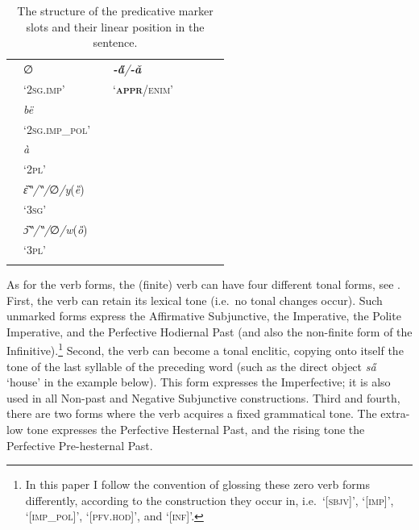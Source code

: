 \documentclass[output=paper,colorlinks,citecolor=brown
]{langscibook}
\begin{document}
\begin{table}
\begin{tabular}{l lllll l l}
 \addlinespace
 & {∅} & {} & {\textit{\textbf{-a̋}/\textbf{-ǎ}}} & {} &  &  &  \\
 & {`\textsc{2sg.imp}'} & {} & {`\textsc{\textbf{appr}/enim}'} & {} &  &  &  \\
 \addlinespace
 & {\textit{bë}} & {} & {} & {} &  &  &  \\
 & {`\textsc{2sg.imp\_pol}'} & {} & {} & {} &  &  &  \\
 \addlinespace
 & {\textit{à}} & {} & {} & {} &  &  &  \\
 & {`\textsc{2pl}'} & {} & {} & {} &  &  &  \\
 \addlinespace
 & {\textit{ɛ̏‶/‶/}∅\textit{/y}(\textit{ȅ})} & {} & {} & {} &  &  &  \\
 & {`\textsc{3sg}'} & {} & {} & {} &  &  &  \\
 \addlinespace
 & {\textit{ɔ̏‶/‶/}∅\textit{/w}(\textit{ȍ})} & {} & {} & {} &  &  &  \\
 & {`\textsc{3pl}'} & {} & {} & {} &  &  &  \\ 
\lspbottomrule
\end{tabular}
\caption{The structure of the predicative marker slots and their linear position in the sentence.} 
\label{tab4}
\end{table}

As for the verb forms, the (finite) verb can have four different tonal forms, see . First, the verb can retain its lexical tone (i.e.\ no tonal changes occur). Such unmarked forms express the Affirmative Subjunctive, the Imperative, the Polite Imperative, and the Perfective Hodiernal Past (and also the non-finite form of the Infinitive).\footnote{In \label{zero} this paper I follow the convention of glossing these zero verb forms differently, according to the construction they occur in, i.e.\ `[\textsc{sbjv}]', `[\textsc{imp}]', `[\textsc{imp\_pol}]', `[\textsc{pfv.hod}]', and `[\textsc{inf}]'.} Second, the verb can become a tonal enclitic, copying onto itself the tone of the last syllable of the preceding word (such as the direct object \textit{sa̋} `house' in the example below). This form expresses the Imperfective; it is also used in all Non-past and Negative Subjunctive constructions. Third and fourth, there are two forms where the verb acquires a fixed grammatical tone. The extra-low tone expresses the Perfective Hesternal Past, and the rising tone the Perfective Pre-hesternal Past.
\end{document}
